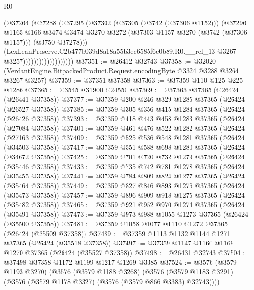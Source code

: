 \begin{lexlean}{R0}
\begin{coremodule}
                                  (@37264
                                    (@37288
                                      (@37295
                                        (@37302
                                          (@37305 (@3742 (@37306 @1152)))
                                          (@37296
                                            @1165
                                            @166
                                            @3474
                                            @3474
                                            @3270
                                            @3272
                                            (@37303 @1157 @3270 (@3742 (@37306 @1157)))
                                            (@3750 @37278)))
                                        (LexLeanPreserve.C2b477b039d8a18a55b3ec6585f6c0b89.R0.__rel_13
                                          @3267
                                          @3257)))))))))))))))))))
@37351 := @26412 @32743
@37358 := @32020 (VerdantEngine.BitpackedProduct.Request.encodingByte @3324 @3288 @3264 @3267 @3257)
@37359 := @37351 @37358
@37363 := @37359 @110 @125 @225 @1286
@37365 := @3545 @31900 @24550
@37369 := @37363 @37365 (@26424 (@26441 @37358))
@37377 := @37359 @200 @246 @329 @1285 @37365 (@26424 (@26527 @37358))
@37385 := @37359 @305 @356 @415 @1284 @37365 (@26424 (@26426 @37358))
@37393 := @37359 @418 @443 @458 @1283 @37365 (@26424 (@27084 @37358))
@37401 := @37359 @461 @476 @522 @1282 @37365 (@26424 (@27163 @37358))
@37409 := @37359 @525 @536 @548 @1281 @37365 (@26424 (@34503 @37358))
@37417 := @37359 @551 @588 @698 @1280 @37365 (@26424 (@34672 @37358))
@37425 := @37359 @701 @720 @732 @1279 @37365 (@26424 (@35446 @37358))
@37433 := @37359 @735 @742 @781 @1278 @37365 (@26424 (@35455 @37358))
@37441 := @37359 @784 @809 @824 @1277 @37365 (@26424 (@35464 @37358))
@37449 := @37359 @827 @846 @893 @1276 @37365 (@26424 (@35473 @37358))
@37457 := @37359 @896 @909 @918 @1275 @37365 (@26424 (@35482 @37358))
@37465 := @37359 @921 @952 @970 @1274 @37365 (@26424 (@35491 @37358))
@37473 := @37359 @973 @988 @1055 @1273 @37365 (@26424 (@35500 @37358))
@37481 := @37359 @1058 @1077 @1110 @1272 @37365 (@26424 (@35509 @37358))
@37489 := @37359 @1113 @1132 @1144 @1271 @37365 (@26424 (@35518 @37358))
@37497 := @37359 @1147 @1160 @1169 @1270 @37365 (@26424 (@35527 @37358))
@37498 := @26431 @32743
@37504 := @37498 @37358 @1172 @1199 @1217 @1269 @3385
@37524 := @3576
    (@3579 @1193 @3270)
    (@3576
      (@3579 @1188 @3268)
      (@3576 (@3579 @1183 @3291) (@3576 (@3579 @1178 @3327) (@3576 (@3579 @866 @3383) @32743))))

\end{coremodule}
\end{lexlean}
